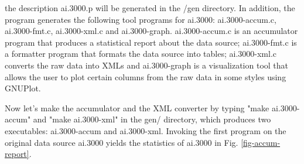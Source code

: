 \documentclass{sig-alternate-sigmod08}
\begin{document}
the \pads{} description ai.3000.p will be generated in
the /gen directory. In addition, the program generates
the following tool programs for ai.3000:
ai.3000-accum.c, ai.3000-fmt.c, ai.3000-xml.c and ai.3000-graph.
ai.3000-accum.c is an accumulator program that produces a
statistical report about the data source; ai.3000-fmt.c is a
formatter program that formats the data source into tables;
ai.3000-xml.c converts the raw data into XMLs and ai.3000-graph is
a visualization tool that allows the user to plot certain
columns from the raw data in some styles using GNUPlot.


Now let's make the accumulator and the XML converter by
typing "make ai.3000-accum" and "make ai.3000-xml" in the
gen/ directory, which produces two executables:
ai.3000-accum and ai.3000-xml. Invoking the first program on
the original data source ai.3000 yields the statistics of
ai.3000 in Fig. \ref{fig-accum-report}.
\end{document}
